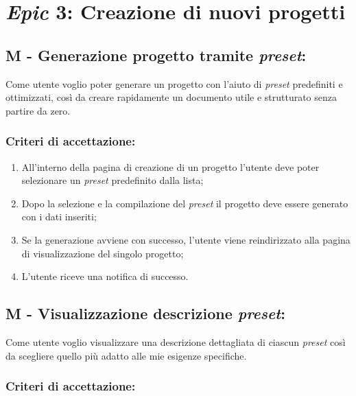 \vspace{0.5cm}

\section*{\textit{Epic} 3: Creazione di nuovi progetti}

\subsection*{M - Generazione progetto tramite \textit{preset}:}

\noindent Come utente voglio poter generare un progetto con l'aiuto di \textit{preset} predefiniti e ottimizzati, così da creare rapidamente un documento utile e strutturato senza partire da zero.

\subsubsection*{Criteri di accettazione:}

\begin{enumerate}
    \item All’interno della pagina di creazione di un progetto l'utente deve poter selezionare un \textit{preset} predefinito dalla lista;
    \item Dopo la selezione e la compilazione del \textit{preset} il progetto deve essere generato con i dati inseriti;
    \item Se la generazione avviene con successo, l’utente viene reindirizzato alla pagina di visualizzazione del singolo progetto;
    \item L’utente riceve una notifica di successo.
\end{enumerate}

\vspace{0.5cm}

\subsection*{M - Visualizzazione descrizione \textit{preset}:}

\noindent Come utente voglio visualizzare una descrizione dettagliata di ciascun \textit{preset} così da scegliere quello più adatto alle mie esigenze specifiche.

\subsubsection*{Criteri di accettazione:}

